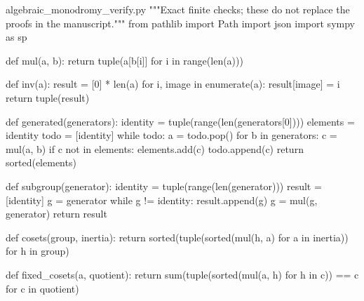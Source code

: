 \begin{filecontents*}[overwrite]{algebraic_monodromy_verify.py}
"""Exact finite checks; these do not replace the proofs in the manuscript."""
from pathlib import Path
import json
import sympy as sp


def mul(a, b):
    return tuple(a[b[i]] for i in range(len(a)))


def inv(a):
    result = [0] * len(a)
    for i, image in enumerate(a):
        result[image] = i
    return tuple(result)


def generated(generators):
    identity = tuple(range(len(generators[0])))
    elements = {identity}
    todo = [identity]
    while todo:
        a = todo.pop()
        for b in generators:
            c = mul(a, b)
            if c not in elements:
                elements.add(c)
                todo.append(c)
    return sorted(elements)


def subgroup(generator):
    identity = tuple(range(len(generator)))
    result = [identity]
    g = generator
    while g != identity:
        result.append(g)
        g = mul(g, generator)
    return result


def cosets(group, inertia):
    return sorted({tuple(sorted(mul(h, a) for a in inertia)) for h in group})


def fixed_cosets(a, quotient):
    return sum(tuple(sorted(mul(a, h) for h in c)) == c for c in quotient)



\end{filecontents*}
